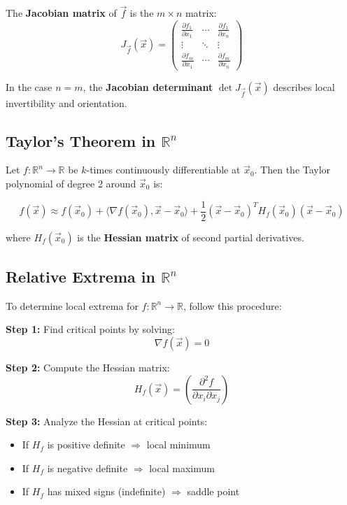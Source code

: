 The \textbf{Jacobian matrix} of \( \vec{f} \) is the \( m \times n \) matrix:
\[
J_{\vec{f}}(\vec{x}) = \begin{pmatrix}
\frac{\partial f_1}{\partial x_1} & \cdots & \frac{\partial f_1}{\partial x_n} \\
\vdots & \ddots & \vdots \\
\frac{\partial f_m}{\partial x_1} & \cdots & \frac{\partial f_m}{\partial x_n}
\end{pmatrix}
\]

In the case \( n = m \), the \textbf{Jacobian determinant} \( \det J_{\vec{f}}(\vec{x}) \) describes local invertibility and orientation.


\subsection{Taylor's Theorem in \( \mathbb{R}^n \)}

Let \( f : \mathbb{R}^n \to \mathbb{R} \) be \( k \)-times continuously differentiable at \( \vec{x}_0 \). Then the Taylor polynomial of degree 2 around \( \vec{x}_0 \) is:

\[
f(\vec{x}) \approx f(\vec{x}_0) + \langle \nabla f(\vec{x}_0), \vec{x} - \vec{x}_0 \rangle + \frac{1}{2} (\vec{x} - \vec{x}_0)^T H_f(\vec{x}_0)(\vec{x} - \vec{x}_0)
\]

where \( H_f(\vec{x}_0) \) is the \textbf{Hessian matrix} of second partial derivatives.


\subsection{Relative Extrema in \( \mathbb{R}^n \)}

To determine local extrema for \( f : \mathbb{R}^n \to \mathbb{R} \), follow this procedure:

\textbf{Step 1:} Find critical points by solving:
\[
\nabla f(\vec{x}) = 0
\]

\textbf{Step 2:} Compute the Hessian matrix:
\[
H_f(\vec{x}) = \left( \frac{\partial^2 f}{\partial x_i \partial x_j} \right)
\]

\textbf{Step 3:} Analyze the Hessian at critical points:
\begin{itemize}[label=\(-\)]
\item If \( H_f \) is positive definite \( \Rightarrow \) local minimum
\item If \( H_f \) is negative definite \( \Rightarrow \) local maximum
\item If \( H_f \) has mixed signs (indefinite) \( \Rightarrow \) saddle point
\end{itemize}

